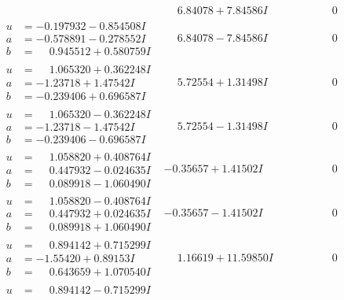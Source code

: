 \documentclass[1p]{elsarticle_modified}
\theoremstyle{definition}
\begin{document}
$$\begin{array}{c|c|c}
 & \phantom{-}6.84078 + 7.84586 I & \phantom{-0.000000 } 0 \\ \hline\begin{aligned}
u &= -0.197932 - 0.854508 I \\
a &= -0.578891 - 0.278552 I \\
b &= \phantom{-}0.945512 + 0.580759 I\end{aligned}
 & \phantom{-}6.84078 - 7.84586 I & \phantom{-0.000000 } 0 \\ \hline\begin{aligned}
u &= \phantom{-}1.065320 + 0.362248 I \\
a &= -1.23718 + 1.47542 I \\
b &= -0.239406 + 0.696587 I\end{aligned}
 & \phantom{-}5.72554 + 1.31498 I & \phantom{-0.000000 } 0 \\ \hline\begin{aligned}
u &= \phantom{-}1.065320 - 0.362248 I \\
a &= -1.23718 - 1.47542 I \\
b &= -0.239406 - 0.696587 I\end{aligned}
 & \phantom{-}5.72554 - 1.31498 I & \phantom{-0.000000 } 0 \\ \hline\begin{aligned}
u &= \phantom{-}1.058820 + 0.408764 I \\
a &= \phantom{-}0.447932 - 0.024635 I \\
b &= \phantom{-}0.089918 - 1.060490 I\end{aligned}
 & -0.35657 + 1.41502 I & \phantom{-0.000000 } 0 \\ \hline\begin{aligned}
u &= \phantom{-}1.058820 - 0.408764 I \\
a &= \phantom{-}0.447932 + 0.024635 I \\
b &= \phantom{-}0.089918 + 1.060490 I\end{aligned}
 & -0.35657 - 1.41502 I & \phantom{-0.000000 } 0 \\ \hline\begin{aligned}
u &= \phantom{-}0.894142 + 0.715299 I \\
a &= -1.55420 + 0.89153 I \\
b &= \phantom{-}0.643659 + 1.070540 I\end{aligned}
 & \phantom{-}1.16619 + 11.59850 I & \phantom{-0.000000 } 0 \\ \hline\begin{aligned}
u &= \phantom{-}0.894142 - 0.715299 I \\

\end{aligned}
\end{array}$$
\end{document}
